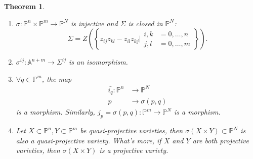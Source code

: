 \documentclass{amsart}
\theoremstyle{plain}
\newtheorem{theorem}{Theorem}
\theoremstyle{definition}
\theoremstyle{remark}
\numberwithin{equation}{section}
\begin{document}
\begin{theorem}
	\begin{enumerate}
		\item $ \sigma:\mathbb{P}^n\times\mathbb{P}^m\to \mathbb{P}^N $ is injective and $ \Sigma $ is closed in $ \mathbb{P}^N $:
		\begin{equation}\label{17}
		\Sigma=Z\left(\left\lbrace z_{ij}z_{kl}-z_{il}z_{kj}|\begin{matrix}
		i,k & =0,\dots,n\\
		j,l & =0,\dots,m
		\end{matrix} \right\rbrace\right).
		\end{equation}
		\item $ \sigma^{ij}:\mathbb{A}^{n+m}\to \Sigma^{ij} $ is an isomorphism.
		\item $ \forall q\in\mathbb{P}^m $, the map 
		\begin{align*}
			\bar{i_q}:  \mathbb{P}^n & \to \mathbb{P}^N\\
			p & \to \sigma(p,q) 
		\end{align*}
		is a morphism. Similarly, $ j_p=\sigma(p,q):\mathbb{P}^m\to \mathbb{P}^N $ is a morphism.
		\item Let $ X\subset \mathbb{P}^n,Y\subset \mathbb{P}^m $ be quasi-projective varieties, then $ \sigma(X\times Y)\subset \mathbb{P}^N $ is also a quasi-projective variety. What's more, if $ X $ and $ Y $ are both projective varieties, then $ \sigma(X\times Y) $ is a projective variety.
	\end{enumerate}
\end{theorem}
\end{document}
